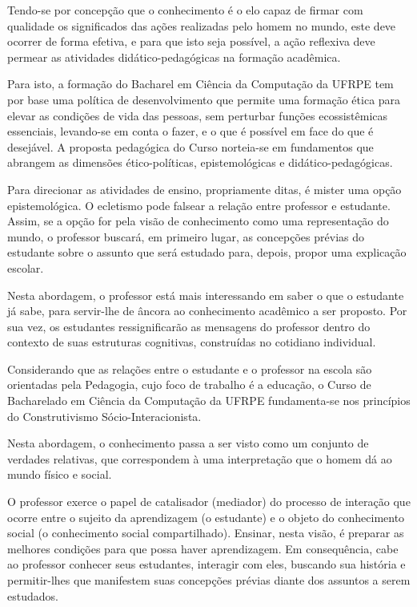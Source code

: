\documentclass[
	12pt,				%
	openright,			%
  oneside,     %
	a4paper,			%
	english,			%
	french,				%
	spanish,			%
	brazil				%
	]{abntex2}
\begin{document}
Tendo-se por concepção que o conhecimento é o elo capaz de firmar com qualidade
os significados das ações realizadas pelo homem no mundo, este deve ocorrer de
forma efetiva, e para que isto seja possível, a ação reflexiva deve permear as
atividades didático-pedagógicas na formação acadêmica.

Para isto, a formação do Bacharel em Ciência da Computação da UFRPE tem por base
uma política de desenvolvimento que permite uma formação ética para elevar as
condições de vida das pessoas, sem perturbar funções ecossistêmicas essenciais,
levando-se em conta o fazer, e o que é possível em face do que é desejável. A
proposta pedagógica do Curso norteia-se em fundamentos que abrangem as dimensões
ético-políticas, epistemológicas e didático-pedagógicas.

Para direcionar as atividades de ensino, propriamente ditas, é mister uma opção
epistemológica. O ecletismo pode falsear a relação entre professor e estudante.
Assim, se a opção for pela visão de conhecimento como uma representação do
mundo, o professor buscará, em primeiro lugar, as concepções prévias do
estudante sobre o assunto que será estudado para, depois, propor uma explicação
escolar.

Nesta abordagem, o professor está mais interessando em saber o que o estudante
já sabe, para servir-lhe de âncora ao conhecimento acadêmico a ser proposto. Por
sua vez, os estudantes ressignificarão as mensagens do professor dentro do
contexto de suas estruturas cognitivas, construídas no cotidiano individual.

Considerando que as relações entre o estudante e o professor na escola são
orientadas pela Pedagogia, cujo foco de trabalho é a educação, o Curso de
Bacharelado em Ciência da Computação da UFRPE fundamenta-se nos princípios do
Construtivismo Sócio-Interacionista.

Nesta abordagem, o conhecimento passa a ser visto como um conjunto de verdades
relativas, que correspondem à uma interpretação que o homem dá ao mundo físico e
social.

O professor exerce o papel de catalisador (mediador) do processo de interação
que ocorre entre o sujeito da aprendizagem (o estudante) e o objeto do
conhecimento social (o conhecimento social compartilhado). Ensinar, nesta visão,
é preparar as melhores condições para que possa haver aprendizagem. Em
consequência, cabe ao professor conhecer seus estudantes, interagir com eles,
buscando sua história e permitir-lhes que manifestem suas concepções prévias
diante dos assuntos a serem estudados.
\end{document}
